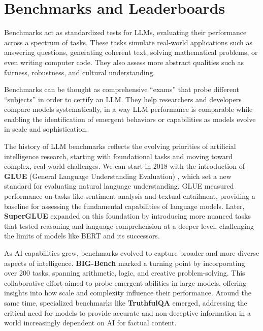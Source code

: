 \section{Benchmarks and Leaderboards}

Benchmarks act as standardized tests for LLMs, evaluating their performance across a spectrum of tasks. These tasks simulate real-world applications such as answering questions, generating coherent text, solving mathematical problems, or even writing computer code. They also assess more abstract qualities such as fairness, robustness, and cultural understanding.

Benchmarks can be thought as comprehensive ``exams'' that probe different ``subjects'' in order to certify an LLM. They help researchers and developers compare models systematically, in a way LLM performance is comparable while enabling the identification of emergent behaviors or capabilities as models evolve in scale and sophistication.

The history of LLM benchmarks reflects the evolving priorities of artificial intelligence research, starting with foundational tasks and moving toward complex, real-world challenges. We can start in 2018 with the introduction of \textbf{GLUE} (General Language Understanding Evaluation) , which set a new standard for evaluating natural language understanding. GLUE measured performance on tasks like sentiment analysis and textual entailment, providing a baseline for assessing the fundamental capabilities of language models. Later, \textbf{SuperGLUE}  expanded on this foundation by introducing more nuanced tasks that tested reasoning and language comprehension at a deeper level, challenging the limits of models like BERT and its successors.

As AI capabilities grew, benchmarks evolved to capture broader and more diverse aspects of intelligence. \textbf{BIG-Bench}  marked a turning point by incorporating over 200 tasks, spanning arithmetic, logic, and creative problem-solving. This collaborative effort aimed to probe emergent abilities in large models, offering insights into how scale and complexity influence their performance. Around the same time, specialized benchmarks like \textbf{TruthfulQA}  emerged, addressing the critical need for models to provide accurate and non-deceptive information in a world increasingly dependent on AI for factual content.

